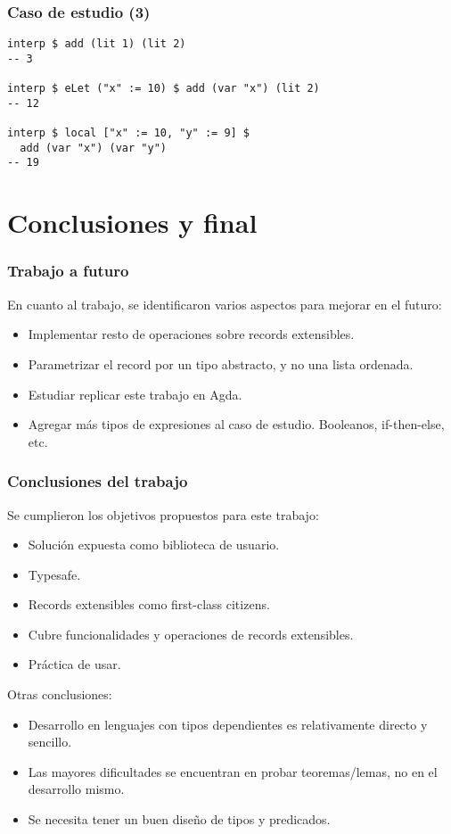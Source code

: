 \documentclass{beamer}
\begin{document}
\begin{frame}[fragile]
\frametitle{Caso de estudio (3)}

\begin{example}
\begin{verbatim}
interp $ add (lit 1) (lit 2)
-- 3

interp $ eLet ("x" := 10) $ add (var "x") (lit 2)
-- 12

interp $ local ["x" := 10, "y" := 9] $ 
  add (var "x") (var "y")
-- 19
\end{verbatim}
\end{example}

\end{frame}

\section{Conclusiones y final}

\begin{frame}
\frametitle{Trabajo a futuro}

En cuanto al trabajo, se identificaron varios aspectos para mejorar en el futuro:

\begin{itemize}
\item Implementar resto de operaciones sobre records extensibles.
\item Parametrizar el record por un tipo abstracto, y no una lista ordenada.
\item Estudiar replicar este trabajo en Agda.
\item Agregar más tipos de expresiones al caso de estudio. Booleanos, if-then-else, etc.
\end{itemize}
\end{frame}

\begin{frame}
\frametitle{Conclusiones del trabajo}

Se cumplieron los objetivos propuestos para este trabajo:

\begin{itemize}
\item Solución expuesta como biblioteca de usuario.
\item Typesafe.
\item Records extensibles como first-class citizens.
\item Cubre funcionalidades y operaciones de records extensibles.
\item Práctica de usar.
\end{itemize}

\pause

Otras conclusiones:

\begin{itemize}
\item Desarrollo en lenguajes con tipos dependientes es relativamente directo y sencillo.
\item Las mayores dificultades se encuentran en probar teoremas/lemas, no en el desarrollo mismo.
\item Se necesita tener un buen diseño de tipos y predicados.
\end{itemize}

\end{frame}
\end{document}
